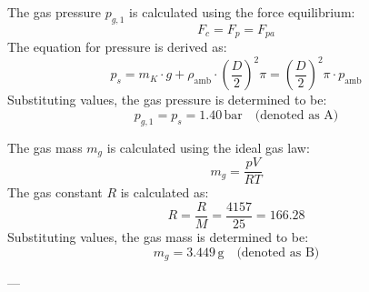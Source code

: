 The gas pressure \( p_{g,1} \) is calculated using the force equilibrium:  
\[
F_c = F_p = F_{pa}
\]  
The equation for pressure is derived as:  
\[
p_s = m_K \cdot g + \rho_{\text{amb}} \cdot \left( \frac{D}{2} \right)^2 \pi = \left( \frac{D}{2} \right)^2 \pi \cdot p_{\text{amb}}
\]  
Substituting values, the gas pressure is determined to be:  
\[
p_{g,1} = p_s = 1.40 \, \text{bar} \quad \text{(denoted as A)}  
\]  

The gas mass \( m_g \) is calculated using the ideal gas law:  
\[
m_g = \frac{p V}{R T}  
\]  
The gas constant \( R \) is calculated as:  
\[
R = \frac{R}{M} = \frac{4157}{25} = 166.28  
\]  
Substituting values, the gas mass is determined to be:  
\[
m_g = 3.449 \, \text{g} \quad \text{(denoted as B)}  
\]  

---
